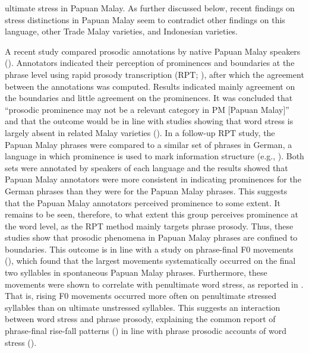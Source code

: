 ultimate stress in Papuan Malay. As further discussed below, recent findings on stress distinctions in Papuan Malay seem to contradict other findings on this language, other Trade Malay varieties, and Indonesian varieties.

A recent study compared prosodic annotations by native Papuan Malay speakers (\citealt{riesberg_perception_2018}). Annotators indicated their perception of prominences and boundaries at the phrase level using rapid prosody transcription (RPT; \citealt{mo_naïve_2008}), after which the agreement between the annotations was computed. Results indicated mainly agreement on the boundaries and little agreement on the prominences. It was concluded that ``prosodic prominence may not be a relevant category in PM [Papuan Malay]'' and that the outcome would be in line with studies showing that word stress is largely absent in related Malay varieties (\citealt{riesberg_perception_2018}). In a follow-up RPT study, the Papuan Malay phrases were compared to a similar set of phrases in German, a language in which prominence is used to mark information structure (e.g., \citealt{grice_deutsche_2002}). Both sets were annotated by speakers of each language and the results showed that Papuan Malay annotators were more consistent in indicating prominences for the German phrases than they were for the Papuan Malay phrases. This suggests that the Papuan Malay annotators perceived prominence to some extent. It remains to be seen, therefore, to what extent this group perceives prominence at the word level, as the RPT method mainly targets phrase prosody. Thus, these studies show that prosodic phenomena in Papuan Malay phrases are confined to boundaries. This outcome is in line with a study on phrase-final F0 movements (\citealt{kaland_different_2019}), which found that the largest movements systematically occurred on the final two syllables in spontaneous Papuan Malay phrases. Furthermore, these movements were shown to correlate with penultimate word stress, as reported in \citet{kluge_grammar_2017}. That is, rising F0 movements occurred more often on penultimate stressed syllables than on ultimate unstressed syllables. This suggests an interaction between word stress and phrase prosody, explaining the common report of phrase-final rise-fall patterns (\citealt{himmelmann_preliminary_2018}) in line with phrase prosodic accounts of word stress (\citealt{gordon_disentangling_2014}).

